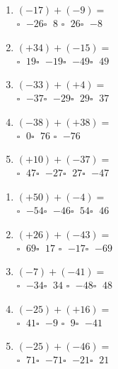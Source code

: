 \documentclass[11pt]{article}
\begin{document}

\begin{center}
\brouillon
\soin
{}
\end{center}

\begin{multicols}{2}
\begin{exercicedevoir}[5][QCM]
\begin{enumerate}[itemsep=0.5em]
\item $ (-17) + (-9) =$ \\ $\square\;$ $-26$\qquad $\square\;$ $8$\qquad
$\square\;$ $26$\qquad $\square\;$ $-8$\qquad
\item $ (+34) + (-15) =$ \\ $\square\;$ $19$\qquad $\square\;$
$-19$\qquad $\square\;$ $-49$\qquad $\square\;$ $49$\qquad
\item $ (-33) + (+4) =$ \\ $\square\;$ $-37$\qquad $\square\;$
$-29$\qquad $\square\;$ $29$\qquad $\square\;$ $37$\qquad
\item $ (-38) + (+38) =$ \\ $\square\;$ $0$\qquad $\square\;$ $76$\qquad
$\square\;$ $-76$\qquad
\item $ (+10) + (-37) =$ \\ $\square\;$ $47$\qquad $\square\;$
$-27$\qquad $\square\;$ $27$\qquad $\square\;$ $-47$\qquad
\end{enumerate}
\end{exercicedevoir}

\begin{exercicedevoir}[5][QCM]
\begin{enumerate}[itemsep=0.5em]
\item $ (+50) + (-4) =$ \\ $\square\;$ $-54$\qquad $\square\;$
$-46$\qquad $\square\;$ $54$\qquad $\square\;$ $46$\qquad
\item $ (+26) + (-43) =$ \\ $\square\;$ $69$\qquad $\square\;$ $17$\qquad
$\square\;$ $-17$\qquad $\square\;$ $-69$\qquad
\item $ (-7) + (-41) =$ \\ $\square\;$ $-34$\qquad $\square\;$ $34$\qquad
$\square\;$ $-48$\qquad $\square\;$ $48$\qquad
\item $ (-25) + (+16) =$ \\ $\square\;$ $41$\qquad $\square\;$ $-9$\qquad
$\square\;$ $9$\qquad $\square\;$ $-41$\qquad
\item $ (-25) + (-46) =$ \\ $\square\;$ $71$\qquad $\square\;$
$-71$\qquad $\square\;$ $-21$\qquad $\square\;$ $21$\qquad
\end{enumerate}
\end{exercicedevoir}


\end{multicols}
\end{document}
